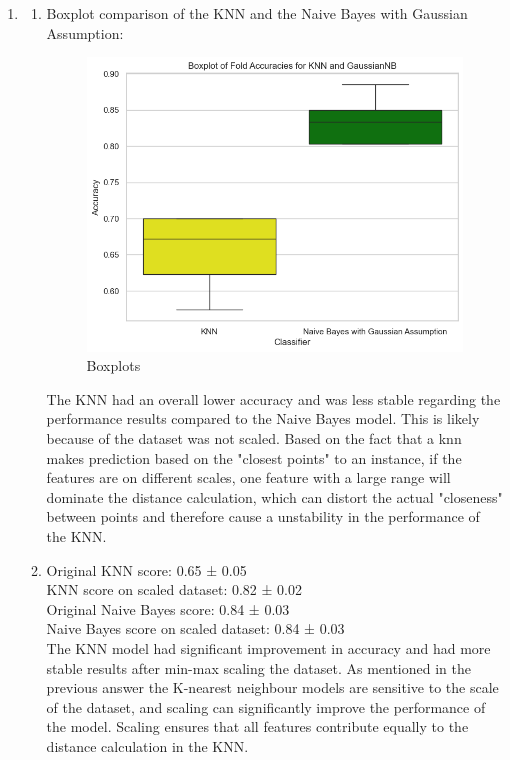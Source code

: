 \documentclass{article}
\begin{document}
\begin{enumerate}[leftmargin=\labelsep]
\item \begin{enumerate}
    \item Boxplot comparison of the KNN and the Naive Bayes with Gaussian Assumption:
    
    \begin{figure}[H]  %
        \centering
        \includegraphics[width=0.8\linewidth]{img/boxplots.png}
        \caption{Boxplots}
        \label{fig:enter-label}
    \end{figure}
    
       The KNN had an overall lower accuracy and was less stable regarding the performance results compared to the Naive Bayes model. This is likely because of the dataset was not scaled. Based on the fact that a knn makes prediction based on the "closest points" to an instance, if the features are on different scales, one feature with a large range will dominate the distance calculation, which can distort the actual "closeness" between points and therefore cause a unstability in the performance of the KNN. 
    
\item 
Original KNN score: 0.65 ± 0.05 \\
KNN score on scaled dataset: 0.82 ± 0.02 \\
Original Naive Bayes score: 0.84 ± 0.03 \\
Naive Bayes score on scaled dataset: 0.84 ± 0.03 \\

The KNN model had significant improvement in accuracy and had more stable results after min-max scaling the dataset. As mentioned in the previous answer the K-nearest neighbour models are sensitive to the scale of the dataset, and scaling can significantly improve the performance of the model. Scaling ensures that all features contribute equally to the distance calculation in the KNN. 


\end{enumerate}
\end{enumerate}
\end{document}
